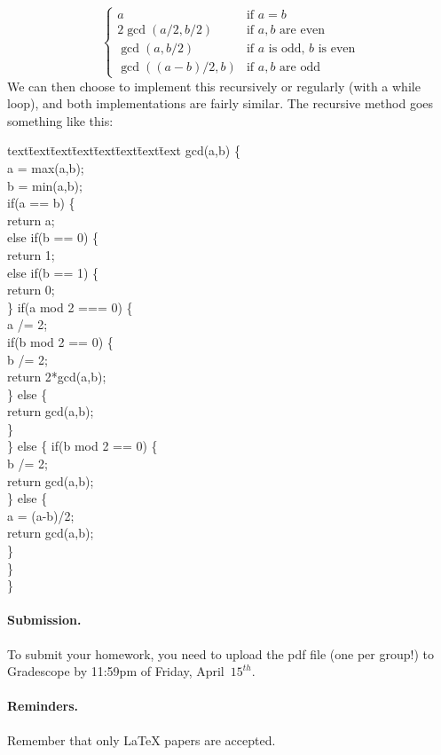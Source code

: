 \documentclass{article}
\begin{document}
\begin{solution}
\begin{itemize}
$$\begin{cases}
	a & \text{if $a=b$} \\
	2\gcd(a/2,b/2) & \text{if $a,b$ are even} \\
	\gcd(a,b/2) & \text{if $a$ is odd, $b$ is even} \\
	\gcd((a-b)/2,b) & \text{if $a,b$ are odd}
	\end{cases}$$
\noindent
We can then choose to implement this recursively or regularly (with a while loop), and both implementations are fairly similar.  The recursive method goes something like this:
\begin{tabbing}
 text\= text\= text\= text\= text\= text\= text\= text\kill
gcd(a,b) \{\\
	\> a = max(a,b);\\
	\> b = min(a,b);\\
	\> if(a == b) \{\\
		\>\> return a;\\
	\> else if(b == 0) \{\\
		\>\> return 1;\\
	\> else if(b == 1) \{\\
		\>\> return 0;\\
	\>\}
	\> if(a mod 2 === 0) \{\\
		\>\> a /= 2;\\
		\>\> if(b mod 2 == 0) \{\\
			\>\>\> b /= 2;\\
			\>\>\> return 2*gcd(a,b);\\
		\>\>\} else \{\\
			\>\>\> return gcd(a,b);\\
		\>\>\}\\
	\>\} else \{
		\>\> if(b mod 2 == 0) \{\\
			\>\>\> b /= 2;\\
			\>\>\> return gcd(a,b);\\
		\>\>\} else \{\\
			\>\>\> a = (a-b)/2;\\
			\>\>\> return gcd(a,b);\\
		\>\>\}\\
	\>\}\\
\}\\		
\end{tabbing}
\end{itemize}
\end{solution}


\paragraph{Submission.}
To submit your homework, you need to upload the pdf file (one per group!) to Gradescope by 11:59pm of Friday, April~$15^{th}$. 

\paragraph{Reminders.}
Remember that only {\LaTeX} papers are accepted. 
\end{document}

